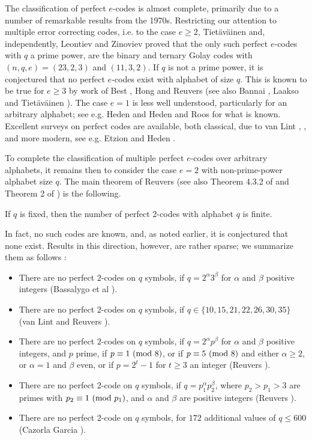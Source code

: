 \documentclass{amsart}
\def\mod#1{{\ifmmode\text{\rm\ (mod~$#1$)}
\else\discretionary{}{}{\hbox{ }}\rm(mod~$#1$)\fi}}
\begin{document}
The classification of perfect $e$-codes is almost complete, primarily due to a number of remarkable results from the 1970s.
Restricting our attention to multiple error correcting codes, i.e. to the case $e \geq 2$,  Tiet\"av\"ainen \cite{Tie1} and, independently, Leontiev and Zinoviev \cite{LZ} proved that the only such perfect $e$-codes with $q$ a prime power, are the binary and ternary Golay codes with $(n,q,e)=(23,2,3)$ and $(11,3,2)$. If $q$ is not a prime power, it is conjectured that no perfect $e$-codes exist with alphabet of size $q$. This is known to be true for $e \geq 3$ by work of Best \cite{Best}, Hong \cite{Hong} and Reuvers \cite{Reu} (see also Bannai \cite{Bann}, Laakso \cite{Laak} and  Tiet\"av\"ainen \cite{Tie2}). The case $e=1$ is less well understood, particularly for an arbitrary alphabet; see e.g. Heden \cite{Hed} and Heden and Roos \cite{HR} for what is known. Excellent surveys on perfect codes are available, both classical, due to van Lint \cite{VL1}, \cite{VL2}, and more modern, see e.g. Etzion \cite{Etz} and Heden \cite{Hed}.

To complete the classification of multiple perfect $e$-codes over arbitrary alphabets, it remains then to consider the case $e=2$ with non-prime-power alphabet size $q$.  The main theorem of Reuvers \cite{Reu0} (see also Theorem 4.3.2 of \cite{Reu} and  Theorem 2 of  \cite{CG}) is the following.
\begin{thm}[Reuvers] \label{reu0}
If $q$ is fixed, then the number of perfect $2$-codes with alphabet $q$ is finite.
\end{thm}
\noindent In fact, no such codes are known, and, as noted earlier, it is conjectured that none exist. Results in this direction, however, are rather sparse; we summarize them as follows :
\begin{itemize}
\item There are no perfect $2$-codes on $q$ symbols, if $q=2^\alpha 3^\beta$ for $\alpha$ and $\beta$ positive integers (Bassalygo et al \cite{BZLF}).
\item There are no perfect $2$-codes on $q$ symbols, if 
$q \in \{ 10, 15, 21, 22, 26, 30, 35 \}$ (van Lint \cite{VL1} and Reuvers \cite{Reu}).
\item  There are no perfect $2$-codes on $q$ symbols, if $q=2^\alpha p^\beta$ for $\alpha$ and $\beta$ positive integers, and $p$ prime, if $p \equiv 1 \mod{8}$, or if $p \equiv 5 \mod{8}$ and either $\alpha \geq 2$,  or $\alpha=1$ and $\beta$ even, or if $p=2^t-1$ for $t \geq 3$ an integer (Reuvers \cite{Reu}).
\item There are no perfect $2$-code on $q$ symbols, if 
$q=p_1^\alpha p_2^\beta$, where $p_2>p_1>3$ are primes with $p_2 \equiv 1 \mod{p_1}$,
and $\alpha$ and $\beta$ are positive integers (Reuvers \cite{Reu}).
\item There are no perfect $2$-code on $q$ symbols, for $172$ additional values of $q \leq 600$ (Cazorla Garcia \cite{CG}).
\end{itemize}
\end{document}
